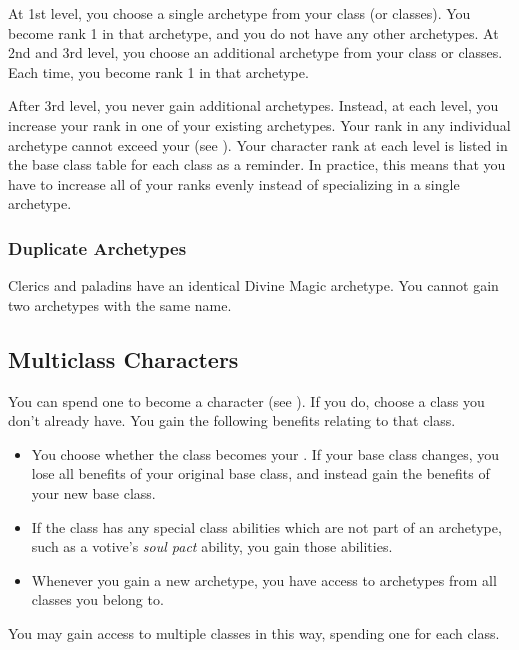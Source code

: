       At 1st level, you choose a single archetype from your class (or classes).
      You become rank 1 in that archetype, and you do not have any other archetypes.
      At 2nd and 3rd level, you choose an additional archetype from your class or classes.
      Each time, you become rank 1 in that archetype.

      After 3rd level, you never gain additional archetypes.
      Instead, at each level, you increase your rank in one of your existing archetypes.
      Your rank in any individual archetype cannot exceed your  (see ).
      Your character rank at each level is listed in the base class table for each class as a reminder.
      In practice, this means that you have to increase all of your ranks evenly instead of specializing in a single archetype.

    \subsubsection{Duplicate Archetypes}\label{Duplicate Archetypes}
      Clerics and paladins have an identical Divine Magic archetype.
      You cannot gain two archetypes with the same name.

  \subsection{Multiclass Characters}\label{Multiclass Characters}
    You can spend one  to become a  character (see ).
    If you do, choose a class you don't already have.
    You gain the following benefits relating to that class.
    \begin{itemize}
      \item You choose whether the class becomes your .
        If your base class changes, you lose all benefits of your original base class, and instead gain the benefits of your new base class.
      \item If the class has any special class abilities which are not part of an archetype, such as a votive's \textit{soul pact} ability, you gain those abilities.
      \item Whenever you gain a new archetype, you have access to archetypes from all classes you belong to.
    \end{itemize}

    You may gain access to multiple classes in this way, spending one  for each class.

